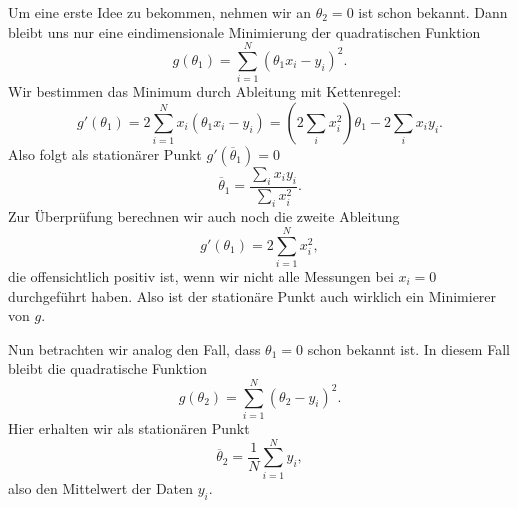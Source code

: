 \documentclass[letterpaper,10pt,english]{jupyterBook}
\begin{document}
Um eine erste Idee zu bekommen, nehmen wir an \(\theta_2 = 0\) ist schon bekannt. Dann bleibt uns nur eine eindimensionale Minimierung der quadratischen Funktion
\begin{equation*}
 g(\theta_1) =  \sum_{i=1}^N (\theta_1 x_i   -y_i)^2 .
\end{equation*}
Wir bestimmen das Minimum durch Ableitung mit Kettenregel:
\begin{equation*}
 g'(\theta_1) = 2 \sum_{i=1}^N x_i (\theta_1 x_i   -y_i) = (2 \sum_i x_i^2) \theta_1 - 2 \sum_i x_i y_i.\end{equation*}
Also folgt als stationärer Punkt \(g'(\overline{\theta}_1) = 0\)
\begin{equation*}
 \overline{\theta}_1 = \frac{\sum_i x_i y_i}{\sum_i x_i^2}.
\end{equation*}
Zur Überprüfung berechnen wir auch noch die zweite Ableitung
\begin{equation*}
 g'(\theta_1) =  2 \sum_{i=1}^N x_i^2,\end{equation*}
die offensichtlich positiv ist, wenn wir nicht alle Messungen bei \(x_i = 0\) durchgeführt haben. Also ist der stationäre Punkt auch wirklich ein Minimierer von \(g\).

Nun betrachten wir analog den Fall, dass \(\theta_1 = 0\) schon bekannt ist. In diesem Fall bleibt die quadratische Funktion
\begin{equation*}
  g(\theta_2) =  \sum_{i=1}^N (\theta_2   -y_i)^2 .
\end{equation*}
Hier erhalten wir als stationären Punkt
\begin{equation*}
 \overline{\theta}_2 = \frac{1}N  \sum_{i=1}^N y_i,\end{equation*}
also den Mittelwert der Daten \(y_i\).
\end{document}
